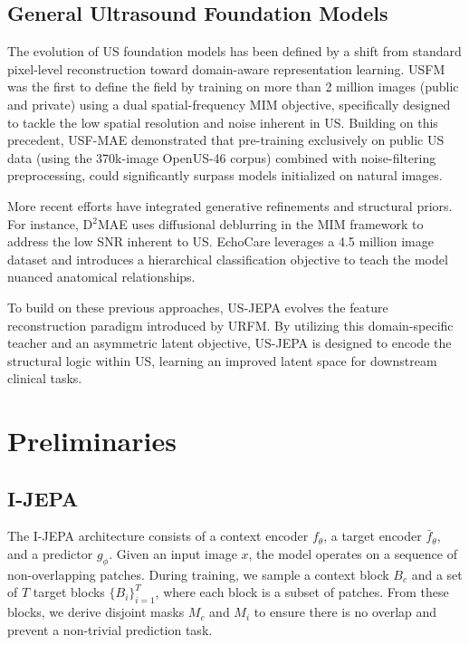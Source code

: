 \documentclass{article}
\theoremstyle{plain}
\theoremstyle{definition}
\theoremstyle{remark}
\begin{document}
\subsection{General Ultrasound Foundation Models}

The evolution of US foundation models has been defined by a shift from standard pixel-level reconstruction toward domain-aware representation learning. USFM \cite{jiao_usfm_2024} was the first to define the field by training on more than 2 million images (public and private) using a dual spatial-frequency MIM objective, specifically designed to tackle the low spatial resolution and noise inherent in US. Building on this precedent, USF-MAE \cite{megahed_usf-mae_2025} demonstrated that pre-training exclusively on public US data (using the 370k-image OpenUS-46 corpus) combined with noise-filtering preprocessing, could significantly surpass models initialized on natural images.

More recent efforts have integrated generative refinements and structural priors. For instance, D$^2$MAE \cite{kang_d2mae_nodate} uses diffusional deblurring in the MIM framework to address the low SNR inherent to US. EchoCare \cite{zhang_fully_2025} leverages a 4.5 million image dataset and introduces a hierarchical classification objective to teach the model nuanced anatomical relationships.

To build on these previous approaches, US-JEPA evolves the feature reconstruction paradigm introduced by URFM. By utilizing this domain-specific teacher and an asymmetric latent objective, US-JEPA is designed to encode the structural logic within US, learning an improved latent space for downstream clinical tasks.

\section{Preliminaries}

\subsection{I-JEPA}

The I-JEPA \cite{assran_self-supervised_2023} architecture consists of a context encoder $f_\theta$, a target encoder $\bar{f}_\theta$, and a predictor $g_\phi$. Given an input image $x$, the model operates on a sequence of non-overlapping patches. During training, we sample a context block $B_c$ and a set of $T$ target blocks $\{B_i\}_{i=1}^T$, where each block is a subset of patches. From these blocks, we derive disjoint masks $M_c$ and $M_i$ to ensure there is no overlap and prevent a non-trivial prediction task.
\end{document}

